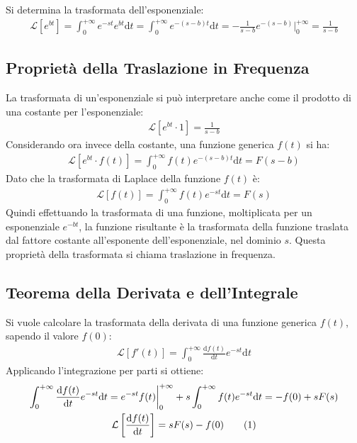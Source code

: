 \documentclass{article}
\newcommand{\df}{\mathrm{d}}
\newcommand{\intab}[4]{\displaystyle\int_{#1}^{#2}{#3}\df{#4}}
\newcommand{\intpinf}[2]{\intab{0}{+\infty}{#1}{#2}}
\numberwithin{equation}{subsection}
\newcommand{\tageq}{\tag{\stepcounter{equation}\theequation}}
\begin{document}
Si determina la trasformata dell'esponenziale:
\begin{gather}
    \mathcal{L}\left[e^{bt}\right]=\intpinf{e^{-st}e^{bt}}{t}=\intpinf{e^{-(s-b)t}}{t}=-\frac{1}{s-b}e^{-(s-b)}\bigg|_0^{+\infty}=\frac{1}{s-b}
\end{gather}

\subsection{Proprietà della Traslazione in Frequenza}

La trasformata di un'esponenziale si può interpretare anche come il prodotto di una costante per l'esponenziale:
\begin{gather*}
    \mathcal{L}\left[e^{bt}\cdot 1\right]=\frac{1}{s-b}
\end{gather*}
Considerando ora invece della costante, una funzione generica $f(t)$ si ha:
\begin{gather}
    \mathcal{L}\left[e^{bt}\cdot f(t)\right]=\intpinf{f(t)e^{-(s-b)t}}{t}=F(s-b)
\end{gather}
Dato che la trasformata di Laplace della funzione $f(t)$ è:
\begin{gather*}
    \mathcal{L}[f(t)]=\intpinf{f(t)e^{-st}}{t}=F(s)
\end{gather*}
Quindi effettuando la trasformata di una funzione, moltiplicata per un esponenziale $e^{-bt}$, la funzione risultante è la trasformata della funzione traslata dal fattore costante all'esponente dell'esponenziale, nel dominio $s$. 
Questa proprietà della trasformata si chiama traslazione in frequenza. 

\subsection{Teorema della Derivata e dell'Integrale}

Si vuole calcolare la trasformata della derivata di una funzione generica $f(t)$, sapendo il valore $f(0)$:
\begin{gather*}
    \mathcal{L}[f'(t)]=\intpinf{\frac{\df f(t)}{\df t}e^{-st}}{t}
\end{gather*}
Applicando l'integrazione per parti si ottiene:
\begin{gather*}
    \intpinf{\frac{\df f(t)}{\df t}e^{-st}}{t}=e^{-st}f(t)\bigg|_0^{+\infty}+s\intpinf{f(t)e^{-st}}{t}=-f(0)+sF(s)\\
    \mathcal{L}\left[\frac{\df f(t)}{\df t}\right]=sF(s)-f(0)\tageq
\end{gather*}
\end{document}
